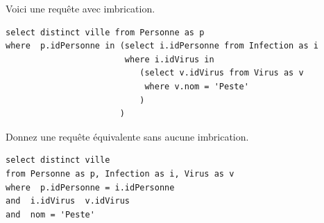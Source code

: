 Voici une requête avec imbrication.
\begin{small}
\begin{verbatim}
select distinct ville from Personne as p 
where  p.idPersonne in (select i.idPersonne from Infection as i
                        where i.idVirus in
                           (select v.idVirus from Virus as v
                            where v.nom = 'Peste'
                           )
                       )
\end{verbatim}               
\end{small}
Donnez une requête équivalente sans aucune imbrication.

\begin{solution}
\begin{verbatim}
select distinct ville 
from Personne as p, Infection as i, Virus as v
where  p.idPersonne = i.idPersonne 
and  i.idVirus  v.idVirus 
and  nom = 'Peste'
\end{verbatim}
\end{solution}


